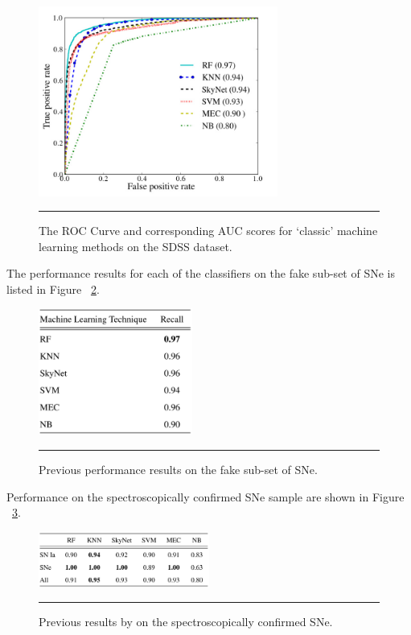 \begin{figure}[htbp]
	\centering
		\includegraphics[width = 0.7\textwidth]{./Figures/classic_ML_result_lise_paper.jpg}
		\rule{35em}{0.5pt}
	\caption[Previous Results]{The ROC Curve and corresponding AUC scores for `classic' machine learning methods on the SDSS dataset\citep{du2014machine}.}
	\label{fig:classic_result}
\end{figure}

The performance results for each of the classifiers on the fake sub-set of SNe is listed in Figure ~\ref{fig:fake_result}.
\begin{figure}[htbp]
	\centering
		\includegraphics[width = 0.45\textwidth]{./Figures/lise_paper_results3_fake.PNG}
		\rule{35em}{0.5pt}
	\caption[Fake SNe QA]{Previous performance results on the fake sub-set of SNe.}
	\label{fig:fake_result}
\end{figure}

Performance on the spectroscopically confirmed SNe sample are shown in Figure ~\ref{fig:spectro_result}.
\begin{figure}[htbp]
	\centering
		\includegraphics[width = 0.5\textwidth]{./Figures/lise_paper_results_spectro.PNG}
		\rule{35em}{0.5pt}
	\caption[SNe confirmed QA]{Previous results by on the spectroscopically confirmed SNe.}
	\label{fig:spectro_result}
\end{figure}


